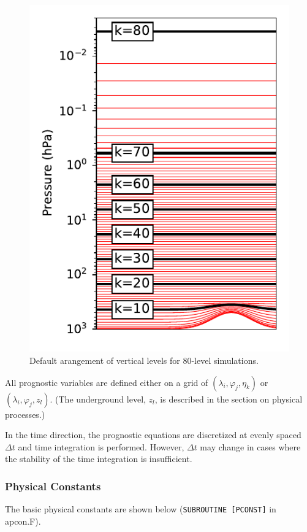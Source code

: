 \begin{figure}
\centering
\includegraphics{../figures/levels.pdf}
\caption{Default arangement of vertical levels for 80-level simulations.}
\end{figure}

All prognostic variables are defined either on a grid of \((\lambda_i, \varphi_j, \eta_k)\) or \((\lambda_i, \varphi_j, z_l)\). (The underground level, \(z_l\), is described in the section on physical
processes.)

In the time direction, the prognostic equations are discretized at evenly spaced \(\Delta t\) and time integration is performed. However, \(\Delta t\) may change in cases where the stability of the
time integration is insufficient.

\hypertarget{physical-constants}{%
\subsubsection{Physical Constants}\label{physical-constants}}

The basic physical constants are shown below (\texttt{SUBROUTINE~{[}PCONST{]}} in apcon.F).

